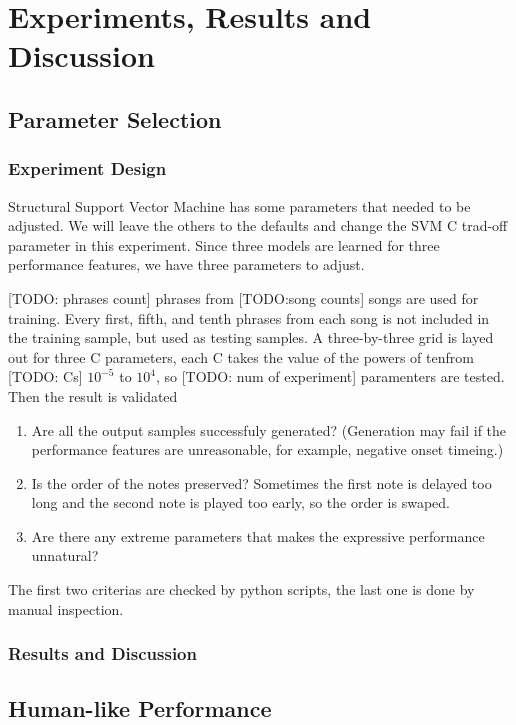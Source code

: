 \chapter{Experiments, Results and Discussion}
\label{chap:exp}
\section{Parameter Selection}
\subsection{Experiment Design}
Structural Support Vector Machine has some parameters that needed to be adjusted. We will leave the others to the defaults and change the SVM C trad-off parameter in this experiment. Since three models are learned for three performance features, we have three parameters to adjust. 

[TODO: phrases count] phrases from [TODO:song counts] songs are used for training. Every first, fifth, and tenth phrases from each song is not included in the training sample, but used as testing samples. A three-by-three grid is layed out for three C parameters, each C takes the value of the powers of tenfrom [TODO: Cs] $10^{-5}$ to $10^4$, so [TODO: num of experiment] paramenters are tested. Then the result is validated
\begin{enumerate}
	\item Are all the output samples successfuly generated? (Generation may fail if the performance features are unreasonable, for example, negative onset timeing.)
	\item Is the order of the notes preserved? Sometimes the first note is delayed too long and the second note is played too early, so the order is swaped.
	\item Are there any extreme parameters that makes the expressive performance unnatural?
\end{enumerate}

The first two criterias are checked by python scripts, the last one is done by manual inspection.


\subsection{Results and Discussion}

\section{Human-like Performance}
